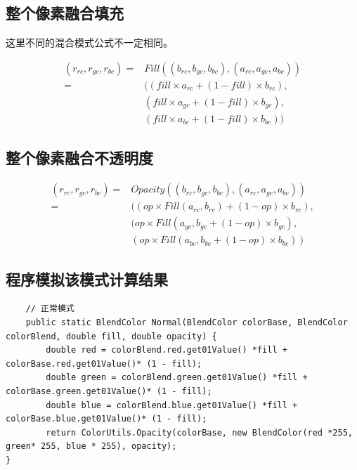 \subsection{ 整个像素融合填充}

这里不同的混合模式公式不一定相同。

\begin{equation}
	\begin{aligned}
		(r_{rc},r_{gc},r_{bc})=&Fill((b_{rc},b_{gc},b_{bc}),(a_{rc},a_{gc},a_{bc}))\\
		=&((fill\times a_{rc} + (1-fill)\times b_{rc}),\\&(fill\times a_{gc} + (1-fill)\times b_{gc}),\\&(fill\times a_{bc} + (1-fill)\times b_{bc}))
		\end{aligned}
\end{equation}

\subsection{ 整个像素融合不透明度}


\begin{equation}
	\begin{aligned}
		(r_{rc},r_{gc},r_{bc})=& Opacity((b_{rc},b_{gc},b_{bc}),(a_{rc},a_{gc},a_{bc}))\\=&((op\times Fill(a_{rc},b_{rc}) + (1-op)\times b_{rc}),\\&(op\times Fill(a_{gc},b_{gc} + (1-op)\times b_{gc}),\\&\textbf{}(op\times Fill(a_{bc},b_{bc} + (1-op)\times b_{bc}))
\end{aligned}
\end{equation}



\subsection{ 程序模拟该模式计算结果}
\begin{lstlisting}
	// 正常模式
	public static BlendColor Normal(BlendColor colorBase, BlendColor colorBlend, double fill, double opacity) {
		double red = colorBlend.red.get01Value() *fill + colorBase.red.get01Value()* (1 - fill);
		double green = colorBlend.green.get01Value() *fill + colorBase.green.get01Value()* (1 - fill);
		double blue = colorBlend.blue.get01Value() *fill + colorBase.blue.get01Value()* (1 - fill);
		return ColorUtils.Opacity(colorBase, new BlendColor(red *255, green* 255, blue * 255), opacity);
}
\end{lstlisting}

